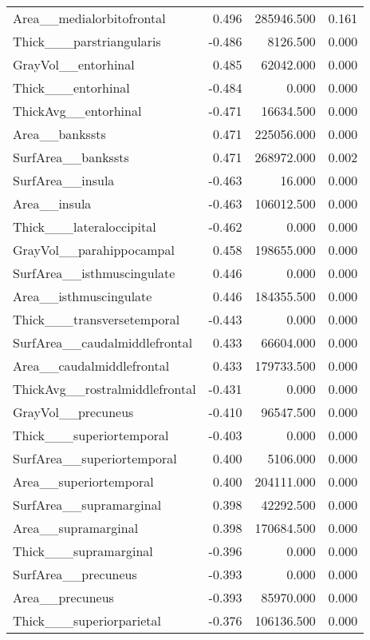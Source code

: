 \documentclass{article}
\begin{document}
\begin{table}
\begin{tabular}{lrrr}
	Area\_\_medialorbitofrontal & 0.496 & 285946.500 & 0.161 \\
	Thick\_\_\_parstriangularis & -0.486 & 8126.500 & 0.000 \\
	GrayVol\_\_entorhinal & 0.485 & 62042.000 & 0.000 \\
	Thick\_\_\_entorhinal & -0.484 & 0.000 & 0.000 \\
	ThickAvg\_\_entorhinal & -0.471 & 16634.500 & 0.000 \\
	Area\_\_bankssts & 0.471 & 225056.000 & 0.000 \\
	SurfArea\_\_bankssts & 0.471 & 268972.000 & 0.002 \\
	SurfArea\_\_insula & -0.463 & 16.000 & 0.000 \\
	Area\_\_insula & -0.463 & 106012.500 & 0.000 \\
	Thick\_\_\_lateraloccipital & -0.462 & 0.000 & 0.000 \\
	GrayVol\_\_parahippocampal & 0.458 & 198655.000 & 0.000 \\
	SurfArea\_\_isthmuscingulate & 0.446 & 0.000 & 0.000 \\
	Area\_\_isthmuscingulate & 0.446 & 184355.500 & 0.000 \\
	Thick\_\_\_transversetemporal & -0.443 & 0.000 & 0.000 \\
	SurfArea\_\_caudalmiddlefrontal & 0.433 & 66604.000 & 0.000 \\
	Area\_\_caudalmiddlefrontal & 0.433 & 179733.500 & 0.000 \\
	ThickAvg\_\_rostralmiddlefrontal & -0.431 & 0.000 & 0.000 \\
	GrayVol\_\_precuneus & -0.410 & 96547.500 & 0.000 \\
	Thick\_\_\_superiortemporal & -0.403 & 0.000 & 0.000 \\
	SurfArea\_\_superiortemporal & 0.400 & 5106.000 & 0.000 \\
	Area\_\_superiortemporal & 0.400 & 204111.000 & 0.000 \\
	SurfArea\_\_supramarginal & 0.398 & 42292.500 & 0.000 \\
	Area\_\_supramarginal & 0.398 & 170684.500 & 0.000 \\
	Thick\_\_\_supramarginal & -0.396 & 0.000 & 0.000 \\
	SurfArea\_\_precuneus & -0.393 & 0.000 & 0.000 \\
	Area\_\_precuneus & -0.393 & 85970.000 & 0.000 \\
	Thick\_\_\_superiorparietal & -0.376 & 106136.500 & 0.000 \\

\end{tabular}
\end{table}
\end{document}
